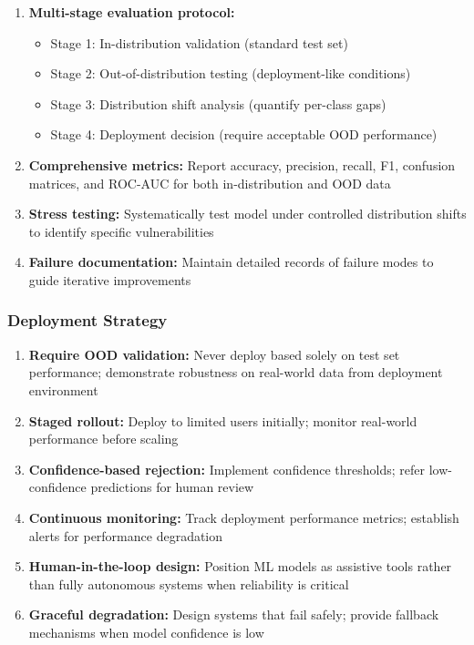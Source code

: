 \documentclass[12pt,a4paper]{article}
\begin{document}
\begin{enumerate}
    \item \textbf{Multi-stage evaluation protocol:}
    \begin{itemize}
        \item Stage 1: In-distribution validation (standard test set)
        \item Stage 2: Out-of-distribution testing (deployment-like conditions)
        \item Stage 3: Distribution shift analysis (quantify per-class gaps)
        \item Stage 4: Deployment decision (require acceptable OOD performance)
    \end{itemize}
    
    \item \textbf{Comprehensive metrics:} Report accuracy, precision, recall, F1, confusion matrices, and ROC-AUC for both in-distribution and OOD data
    
    \item \textbf{Stress testing:} Systematically test model under controlled distribution shifts to identify specific vulnerabilities
    
    \item \textbf{Failure documentation:} Maintain detailed records of failure modes to guide iterative improvements
\end{enumerate}

\subsubsection{Deployment Strategy}

\begin{enumerate}
    \item \textbf{Require OOD validation:} Never deploy based solely on test set performance; demonstrate robustness on real-world data from deployment environment
    
    \item \textbf{Staged rollout:} Deploy to limited users initially; monitor real-world performance before scaling
    
    \item \textbf{Confidence-based rejection:} Implement confidence thresholds; refer low-confidence predictions for human review
    
    \item \textbf{Continuous monitoring:} Track deployment performance metrics; establish alerts for performance degradation
    
    \item \textbf{Human-in-the-loop design:} Position ML models as assistive tools rather than fully autonomous systems when reliability is critical
    
    \item \textbf{Graceful degradation:} Design systems that fail safely; provide fallback mechanisms when model confidence is low
\end{enumerate}
\end{document}
